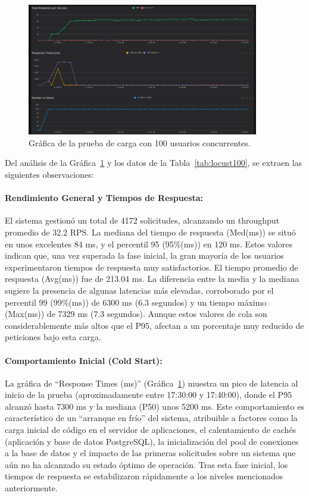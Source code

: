 \begin{figure}[H]
\centering
\includegraphics[width=0.9\textwidth]{figures/08_100_1.png}
\caption{Gráfica de la prueba de carga con 100 usuarios concurrentes.}
\label{fig:locust100}
\end{figure}

Del análisis de la Gráfica~\ref{fig:locust100} y los datos de la Tabla~\ref{tab:locust100}, se extraen las siguientes observaciones:

\paragraph{Rendimiento General y Tiempos de Respuesta:}
El sistema gestionó un total de 4172 solicitudes, alcanzando un throughput promedio de 32.2 RPS. La mediana del tiempo de respuesta (Med(ms)) se situó en unos excelentes 84 ms, y el percentil 95 (95\%(ms)) en 120 ms. Estos valores indican que, una vez superada la fase inicial, la gran mayoría de los usuarios experimentaron tiempos de respuesta muy satisfactorios.
El tiempo promedio de respuesta (Avg(ms)) fue de 213.04 ms. La diferencia entre la media y la mediana sugiere la presencia de algunas latencias más elevadas, corroborado por el percentil 99 (99\%(ms)) de 6300 ms (6.3 segundos) y un tiempo máximo (Max(ms)) de 7329 ms (7.3 segundos). Aunque estos valores de cola son considerablemente más altos que el P95, afectan a un porcentaje muy reducido de peticiones bajo esta carga.

\paragraph{Comportamiento Inicial (Cold Start):}
La gráfica de ``Response Times (ms)'' (Gráfica~\ref{fig:locust100}) muestra un pico de latencia al inicio de la prueba (aproximadamente entre 17:30:00 y 17:40:00), donde el P95 alcanzó hasta 7300 ms y la mediana (P50) unos 5200 ms. Este comportamiento es característico de un ``arranque en frío'' del sistema, atribuible a factores como la carga inicial de código en el servidor de aplicaciones, el calentamiento de cachés (aplicación y base de datos PostgreSQL), la inicialización del pool de conexiones a la base de datos y el impacto de las primeras solicitudes sobre un sistema que aún no ha alcanzado su estado óptimo de operación. Tras esta fase inicial, los tiempos de respuesta se estabilizaron rápidamente a los niveles mencionados anteriormente.

